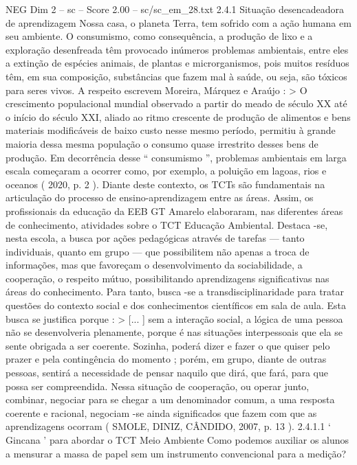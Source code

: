 \begin{textsample}{NEG Dim 2 – sc – Score 2.00 – sc/sc\_em\_28.txt}  \label{ex:f2_neg_279}
2.4.1 Situação desencadeadora de aprendizagem Nossa casa, o planeta Terra, tem sofrido com a ação humana em seu ambiente.
O consumismo, como consequência, a produção de lixo e a exploração desenfreada têm provocado inúmeros problemas ambientais, entre eles a extinção de espécies animais, de plantas e microrganismos, pois muitos resíduos têm, em sua composição, substâncias que fazem mal à saúde, ou seja, são tóxicos para seres vivos.
A respeito escrevem Moreira, Márquez e Araújo : > O crescimento populacional mundial observado a partir do meado de século XX até o início do século XXI, aliado ao ritmo crescente de produção de alimentos e bens materiais modificáveis de baixo custo nesse mesmo período, permitiu à grande maioria dessa mesma população o consumo quase irrestrito desses bens de produção.
Em decorrência desse “ consumismo ”, problemas ambientais em larga escala começaram a ocorrer como, por exemplo, a poluição em lagoas, rios e oceanos ( 2020, p. 2 ).
Diante deste contexto, os TCTs são fundamentais na articulação do processo de ensino-aprendizagem entre as áreas.
Assim, os profissionais da educação da EEB GT Amarelo elaboraram, nas diferentes áreas de conhecimento, atividades sobre o TCT Educação Ambiental.
Destaca -se, nesta escola, a busca por ações pedagógicas através de tarefas — tanto individuais, quanto em grupo — que possibilitem não apenas a troca de informações, mas que favoreçam o desenvolvimento da sociabilidade, a cooperação, o respeito mútuo, possibilitando aprendizagens significativas nas áreas do conhecimento.
Para tanto, busca -se a transdisciplinaridade para tratar questões do contexto social e dos conhecimentos científicos em sala de aula.
Esta busca se justifica porque : > [... ] sem a interação social, a lógica de uma pessoa não se desenvolveria plenamente, porque é nas situações interpessoais que ela se sente obrigada a ser coerente.
Sozinha, poderá dizer e fazer o que quiser pelo prazer e pela contingência do momento ; porém, em grupo, diante de outras pessoas, sentirá a necessidade de pensar naquilo que dirá, que fará, para que possa ser compreendida.
Nessa situação de cooperação, ou operar junto, combinar, negociar para se chegar a um denominador comum, a uma resposta coerente e racional, negociam -se ainda significados que fazem com que as aprendizagens ocorram ( SMOLE, DINIZ, CÂNDIDO, 2007, p. 13 ). 2.4.1.1 ‘ Gincana ’ para abordar o TCT Meio Ambiente Como podemos auxiliar os alunos a mensurar a massa de papel sem um instrumento convencional para a medição?

\end{textsample}
